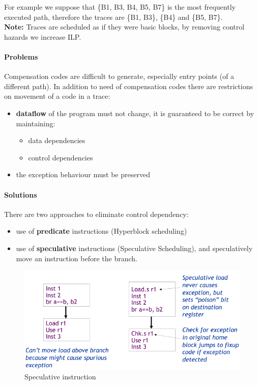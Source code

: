 For example we suppose that \{B1, B3, B4, B5, B7\} is the most frequently executed path, therefore the traces are
\{B1, B3\}, \{B4\} and \{B5, B7\}.\\
\textbf{Note:} Traces are scheduled as if they were basic blocks, by removing control hazards we increase ILP\@.

\paragraph{Problems} Compensation codes are difficult to generate, especially entry points (of a different path).
In addition to need of compensation codes there are
restrictions on movement of a code in a trace:
\begin{itemize}
    \item \textbf{dataflow} of the program must not change, it is guaranteed to be correct by maintaining:
    \begin{itemize}
        \item data dependencies
        \item control dependencies
    \end{itemize}
    \item the exception behaviour must be preserved
\end{itemize}


\paragraph{Solutions}There are two approaches to eliminate control dependency:
\begin{itemize}
    \item use of \textbf{predicate} instructions (Hyperblock scheduling)
    \item use of \textbf{speculative} instructions (Speculative Scheduling), and speculatively move an instruction
    before the branch.
\end{itemize}

\begin{figure}[h]
    \centering
    \includegraphics[scale = 0.4]{images/speculative-instruction}
    \caption{Speculative instruction}
    \label{fig:speculative-instruction}
\end{figure}

